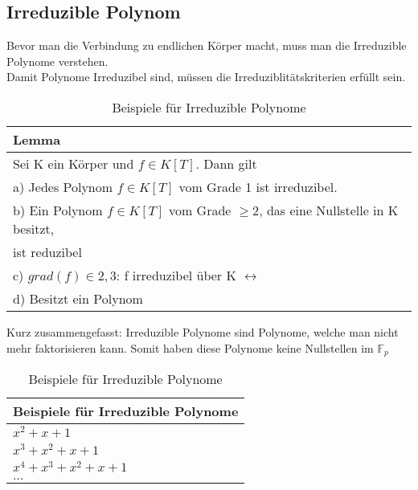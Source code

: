 \subsection*{Irreduzible Polynom}


Bevor man die Verbindung zu endlichen Körper macht, muss man die Irreduzible Polynome verstehen.\\
Damit Polynome Irreduzibel sind, müssen die Irreduziblitätskriterien erfüllt sein.\\

\begin{table}[!ht]
    \centering
        \begin{tabular}{l}
            \toprule
            \textbf{Lemma}\\
            \midrule
            Sei K ein Körper und $ f \in K[T]$. Dann gilt\\
            a) Jedes Polynom $ f \in K[T]$ vom Grade 1 ist irreduzibel.\\
            b) Ein Polynom $ f \in K[T]$ vom Grade $\geq 2$, das eine Nullstelle in K besitzt,\\
             ist reduzibel \\
            c) $grad(f) \in {2,3}$: f irreduzibel über K $ \leftrightarrow $ \\
            d) Besitzt ein Polynom $ $\\
           \bottomrule
        \end{tabular}
        \caption{Beispiele für Irreduzible Polynome}
        \label{tab3}
    \end{table}


Kurz zusammengefasst: Irreduzible Polynome sind Polynome, welche man nicht mehr faktorisieren kann. Somit haben diese Polynome keine Nullstellen im $\mathbb{F}_{p} $


\begin{table}[!ht]
    \centering
        \begin{tabular}{l}
            \toprule
            \textbf{Beispiele für Irreduzible Polynome}\\
            \midrule
            $ x^2+ x + 1$\\
            $x^3 + x^2 + x + 1$ \\
            $x^4 + x^3  + x^2 + x + 1$\\
            $...$\\
           \bottomrule
        \end{tabular}
        \caption{Beispiele für Irreduzible Polynome}
        \label{tab3}
    \end{table}

